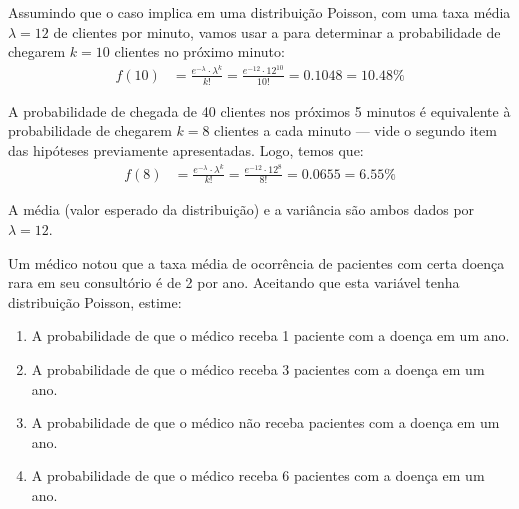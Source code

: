 \begin{sol}
Assumindo que o caso implica em uma distribuição Poisson, com uma taxa média
$\lambda = 12$ de clientes por minuto, vamos usar a  para
determinar a probabilidade de chegarem $k=10$ clientes no próximo minuto:
\begin{align*}
    f(10) &= \frac{e^{-\lambda} \cdot \lambda^{k}}{k!}
           = \frac{e^{-12} \cdot 12^{10}}{10!}
           = 0.1048 = 10.48 \%
\end{align*}

A probabilidade de chegada de 40 clientes nos próximos 5 minutos é equivalente
à probabilidade de chegarem $k=8$ clientes a cada minuto --- vide o segundo
item das hipóteses previamente apresentadas. Logo, temos que:
\begin{align*}
    f(8) &= \frac{e^{-\lambda} \cdot \lambda^{k}}{k!}
           = \frac{e^{-12} \cdot 12^{8}}{8!}
           = 0.0655 = 6.55 \%
\end{align*}

A média (valor esperado da distribuição) e a variância são ambos dados por
$\lambda=12$.
\end{sol}

\begin{eg}
Um médico notou que a taxa média de ocorrência de pacientes com certa doença rara em
seu consultório é de 2 por ano. Aceitando que esta variável tenha distribuição Poisson, estime:
\begin{enumerate}[label=\alph*)]
    \item A probabilidade de que o médico receba 1 paciente com a doença em um ano.
    \item A probabilidade de que o médico receba 3 pacientes com a doença em um ano.
    \item A probabilidade de que o médico não receba pacientes com a doença em um ano.
    \item A probabilidade de que o médico receba 6 pacientes com a doença em um ano.
\end{enumerate}
\end{eg}

